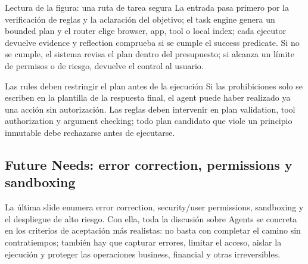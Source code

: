 
\begin{knowledgebox}{Lectura de la figura: una ruta de tarea segura}
La entrada pasa primero por la verificación de reglas y la aclaración del objetivo; el task engine genera un bounded plan y el router elige browser, app, tool o local index; cada ejecutor devuelve evidence y reflection comprueba si se cumple el success predicate. Si no se cumple, el sistema revisa el plan dentro del presupuesto; si alcanza un límite de permisos o de riesgo, devuelve el control al usuario.
\end{knowledgebox}

\begin{warningbox}{Las rules deben restringir el plan antes de la ejecución}
Si las prohibiciones solo se escriben en la plantilla de la respuesta final, el agent puede haber realizado ya una acción sin autorización. Las reglas deben intervenir en plan validation, tool authorization y argument checking; todo plan candidato que viole un principio inmutable debe rechazarse antes de ejecutarse.
\end{warningbox}


\subsection{Future Needs: error correction, permissions y sandboxing}

La última slide enumera error correction, security/user permissions, sandboxing y el despliegue de alto riesgo. Con ella, toda la discusión sobre Agents se concreta en los criterios de aceptación más realistas: no basta con completar el camino sin contratiempos; también hay que capturar errores, limitar el acceso, aislar la ejecución y proteger las operaciones business, financial y otras irreversibles.



